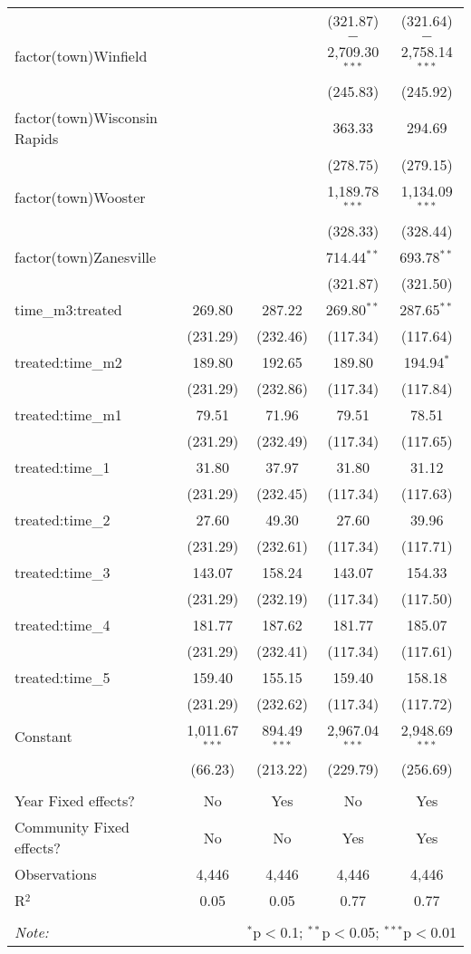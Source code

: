 \begin{table}[!htbp]
\begin{tabular}{@{\extracolsep{5pt}}lcccc}
  &  &  & (321.87) & (321.64) \\ 
  factor(town)Winfield &  &  & $-$2,709.30$^{***}$ & $-$2,758.14$^{***}$ \\ 
  &  &  & (245.83) & (245.92) \\ 
  factor(town)Wisconsin Rapids &  &  & 363.33 & 294.69 \\ 
  &  &  & (278.75) & (279.15) \\ 
  factor(town)Wooster &  &  & 1,189.78$^{***}$ & 1,134.09$^{***}$ \\ 
  &  &  & (328.33) & (328.44) \\ 
  factor(town)Zanesville &  &  & 714.44$^{**}$ & 693.78$^{**}$ \\ 
  &  &  & (321.87) & (321.50) \\ 
  time\_m3:treated & 269.80 & 287.22 & 269.80$^{**}$ & 287.65$^{**}$ \\ 
  & (231.29) & (232.46) & (117.34) & (117.64) \\ 
  treated:time\_m2 & 189.80 & 192.65 & 189.80 & 194.94$^{*}$ \\ 
  & (231.29) & (232.86) & (117.34) & (117.84) \\ 
  treated:time\_m1 & 79.51 & 71.96 & 79.51 & 78.51 \\ 
  & (231.29) & (232.49) & (117.34) & (117.65) \\ 
  treated:time\_1 & 31.80 & 37.97 & 31.80 & 31.12 \\ 
  & (231.29) & (232.45) & (117.34) & (117.63) \\ 
  treated:time\_2 & 27.60 & 49.30 & 27.60 & 39.96 \\ 
  & (231.29) & (232.61) & (117.34) & (117.71) \\ 
  treated:time\_3 & 143.07 & 158.24 & 143.07 & 154.33 \\ 
  & (231.29) & (232.19) & (117.34) & (117.50) \\ 
  treated:time\_4 & 181.77 & 187.62 & 181.77 & 185.07 \\ 
  & (231.29) & (232.41) & (117.34) & (117.61) \\ 
  treated:time\_5 & 159.40 & 155.15 & 159.40 & 158.18 \\ 
  & (231.29) & (232.62) & (117.34) & (117.72) \\ 
  Constant & 1,011.67$^{***}$ & 894.49$^{***}$ & 2,967.04$^{***}$ & 2,948.69$^{***}$ \\ 
  & (66.23) & (213.22) & (229.79) & (256.69) \\ 
 \hline \\[-1.8ex] 
Year Fixed effects? & No & Yes & No & Yes \\ 
Community Fixed effects? & No & No & Yes & Yes \\ 
Observations & 4,446 & 4,446 & 4,446 & 4,446 \\ 
R$^{2}$ & 0.05 & 0.05 & 0.77 & 0.77 \\ 
\hline 
\hline \\[-1.8ex] 
\textit{Note:}  & \multicolumn{4}{r}{$^{*}$p$<$0.1; $^{**}$p$<$0.05; $^{***}$p$<$0.01} \\ 
\end{tabular} 
\end{table} 
